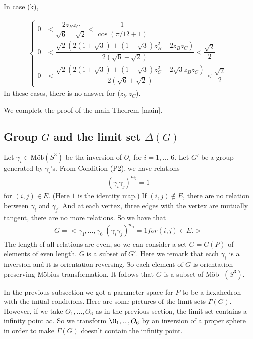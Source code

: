 \documentclass[dvipdfmx]{interact}
\theoremstyle{plain}%
\theoremstyle{definition}
\theoremstyle{remark}
\theoremstyle{problemstyle}
\begin{document}
In case (k),

\begin{align*}
 \begin{cases}
  0 &< \dfrac{2z_Bz_C}{\sqrt{6} + \sqrt{2}} < \dfrac{1}{\cos(\pi/12+1)}\\
  0 &< \dfrac{\sqrt{2}(2 (1 + \sqrt{3}) + (1 + \sqrt{3})z^2_B -2z_Bz_C)}
  {2(\sqrt{6} + \sqrt{2})} < \dfrac{\sqrt{2}}{2}\\
  0 &< \dfrac{\sqrt{2}(2 (1 + \sqrt{3}) + (1 + \sqrt{3})z^2_C
  -2\sqrt{3}z_Bz_C)}
  {2(\sqrt{6} + \sqrt{2})} < \dfrac{\sqrt{2}}{2}
 \end{cases}
\end{align*}
In these cases, there is no answer for ($z_b, z_C$).

We complete the proof of the main Theorem \ref{main}.

\subsection{Group $G$ and the limit set $\Delta(G)$}
Let $\gamma_i \in \text{M\"ob}(S^3)$ be the inversion of $O_i$ for $i =
1,...,6$.
Let $G'$ be a group generated by $\gamma_i$'s. From Condition (P2), we
have relations
\begin{align*}
 (\gamma_i \gamma_j)^{n_{ij}} = 1
\end{align*}
for $(i, j) \in E.$ (Here $1$ is the identity map.) If $(i, j) \notin E$,
there are no relation between $\gamma_i$ and $\gamma_j$.
And at each vertex, three edges with the vertex are mutually tangent,
there are no more relations. So we have that
\begin{align*}
 \tilde G = <\gamma_1, ...,\gamma_6 | (\gamma_i\gamma_j)^{n_{ij}} = 1 for
 (i, j) \in E.>
\end{align*}
The length of all relations are even, so we can consider a set $G = G(P)$
of elements of even length. $G$ is a subset of $G'$. Here we remark
that each $\gamma_i$ is a inversion and it is orientation reversing. So
each element of $G$ is orientation preserving M\"obius transformation.
It follows that $G$ is a subset of M\"ob$_+(S^3)$.

In the previous subsection we got a parameter space for $P$ to be a
hexahedron with the initial conditions. Here are some pictures of the
limit sets $\Gamma(G)$. However, if we take $O_1, ..., O_6$ as in the
previous section, the limit set contains a infinity point $\infty$. So
we transform $\O_1, ..., O_6$ by an inversion of a proper sphere in
order to make $\Gamma(G)$ doesn't contain the infinity point.
\end{document}

